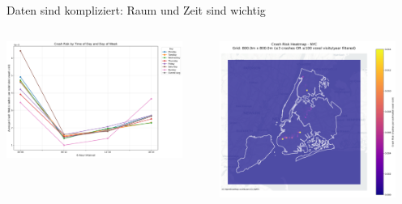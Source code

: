 \documentclass[aspectratio=169,xcolor={usenames,dvipsnames,svgnames,table},10pt,usepdftitle=false,hyperref={bookmarksdepth=3}]{beamer}
\makeatletter
\renewenvironment{figure}[1][]{%
  \def\@captype{figure}%
  \par\centering}
  {\par}
\makeatother
\begin{document}
\begin{frame}{Daten sind kompliziert: Raum und Zeit sind wichtig}
    \begin{columns}
        \begin{column}{0.57\textwidth}
            \begin{figure}
                \centering
                \includegraphics[width=0.9\textwidth]{../results/cellx800m_celly800m_cellt6h/plots/crash_risk_by_day_and_time_800.0m_800.0m_6.0h.png}
                \caption{Risiko variiert nach Tag und Zeit}
            \end{figure}
        \end{column}
        
        \begin{column}{0.43\textwidth}
            \begin{figure}
                \centering
                \includegraphics[width=0.9\textwidth]{../results/cellx800m_celly800m_cellt6h/plots/spatial_risk_heatmap_800.0m_800.0m_6.0h_filtered.png}
                \caption{Risiko variiert nach Standort}
            \end{figure}
        \end{column}
    \end{columns}
    
    \vspace{0.3cm}
\end{frame}
\end{document}
